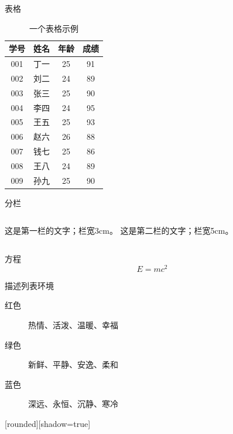 \begin{frame}{表格}
    \begin{table}
    \centering
    \caption{一个表格示例}
    \begin{tabular}{|c|c|c|c|}
    \hline
    \rowcolor{blue!50}学号&姓名&年龄&成绩\\
    \hline
    001 & 丁一 & 25 & 91\\
    002 & 刘二 & 24 & 89\\
    003 & 张三 & 25 & 90\\
    004 & 李四 & 24 & 95\\
    005 & 王五 & 25 & 93\\
    006 & 赵六 & 26 & 88\\
    007 & 钱七 & 25 & 86\\
    008 & 王八 & 24 & 89\\
    009 & 孙九 & 25 & 90\\
    \hline
    \end{tabular}
    \end{table}
\end{frame}

\begin{frame}{分栏}
        \begin{columns}
        \column{3cm}
        这是第一栏的文字；栏宽3cm。
        \column{5cm}
        这是第二栏的文字；栏宽5cm。
        \end{columns}
\end{frame}

\begin{frame}{方程}
        \begin{equation}
        E=mc^2
        \label{emc}
        \end{equation}
\end{frame}

\begin{frame}{描述列表环境}
\begin{description}
    \item[红色] 热情、活泼、温暖、幸福
    \item[绿色] 新鲜、平静、安逸、柔和
    \item[蓝色] 深远、永恒、沉静、寒冷
\end{description}
\end{frame}

[rounded][shadow=true]

